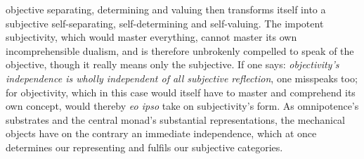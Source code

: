 \documentclass[12pt]{book}
\begin{document}
objective separating, determining and valuing then transforms itself into a
subjective self-separating, self-determining and self-valuing. The impotent
subjectivity, which would master everything, cannot master its own
incomprehensible dualism, and is therefore unbrokenly compelled to speak of
the objective, though it really means only the subjective. If one says:
\emph{objectivity's independence is wholly independent of all subjective
reflection}, one misspeaks too; for objectivity, which in this case would
itself have to master and comprehend its own concept, would thereby
\textit{eo ipso} take on subjectivity's form. As omnipotence's substrates
and the central monad's substantial representations, the mechanical objects
have on the contrary an immediate independence, which at once determines our
representing and fulfils our subjective categories.
\end{document}
